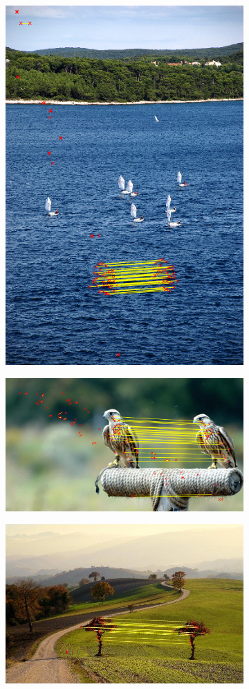 \documentclass[12pt]{article}
\begin{document}
\begin{figure}
\centering
\begin{subfigure}{.5\textwidth}
  \centering
  \includegraphics[width=.8\linewidth]{./gfx/success_sailing.png}
\end{subfigure}%
\begin{subfigure}{.5\textwidth}
  \centering
  \includegraphics[width=.8\linewidth]{./gfx/falcon.png}
\end{subfigure}
\begin{subfigure}{.5\textwidth}
  \centering
  \includegraphics[width=.8\linewidth]{../results/tree/sift_anms.jpg}

\end{subfigure}
\end{figure}
\end{document}
